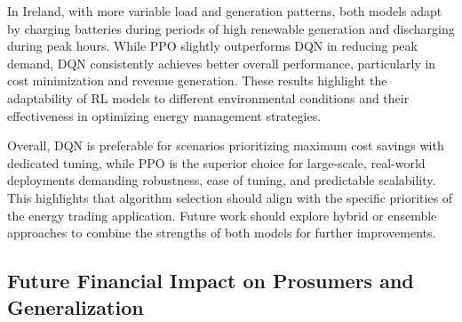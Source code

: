 \documentclass[preprint,12pt]{elsarticle}
\begin{document}
In Ireland, with more variable load and generation patterns, both models adapt by charging batteries during periods of high renewable generation and discharging during peak hours. While PPO slightly outperforms DQN in reducing peak demand, DQN consistently achieves better overall performance, particularly in cost minimization and revenue generation. These results highlight the adaptability of RL models to different environmental conditions and their effectiveness in optimizing energy management strategies.

Overall, DQN is preferable for scenarios prioritizing maximum cost savings with dedicated tuning, while PPO is the superior choice for large-scale, real-world deployments demanding robustness, ease of tuning, and predictable scalability. This highlights that algorithm selection should align with the specific priorities of the energy trading application. Future work should explore hybrid or ensemble approaches to combine the strengths of both models for further improvements.

\subsection{Future Financial Impact on Prosumers and Generalization}
\label{generalization}
\end{document}
